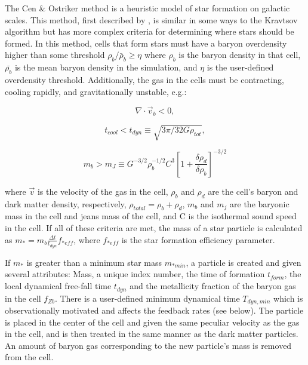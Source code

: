 
The Cen \& Ostriker method is a heuristic model of star formation
on galactic scales.  This method, first described by
\citet{CO1992}, is similar in some ways to the Kravtsov algorithm
but has more complex criteria for determining where stars should
be formed.  In this method, cells that form stars must have a 
baryon overdensity higher than some threshold 
$\rho_b/\bar{\rho}_b \geq \eta$ 
where $\rho_b$ is the baryon density in that cell, 
$\bar{\rho_b}$ is the mean baryon density in the simulation,
and $\eta$ is the user-defined overdensity threshold.
Additionally, the gas in the cells must be contracting, 
cooling rapidly, and gravitationally unstable, e.g.:

\begin{equation}
\nabla \cdot \vec{v}_b < 0,
\label{cencont}
\end{equation}

\begin{equation}
t_{cool} < t_{dyn} \equiv \sqrt{3 \pi / 32G \rho_{tot}},
\end{equation}

\begin{equation}
m_{b} > m_{J} \equiv G^{-3/2} \rho_{b}^{-1/2}C^{3}
\left[ 1 + \frac{\delta\rho_{d}}{\delta\rho_{b}} \right]^{-3/2}
\end{equation}

where $\vec{v}$ is the velocity of the gas in the cell, $\rho_{b}$ and 
$\rho_{d}$ are the cell's baryon and dark matter density, respectively,
$\rho_{total} = \rho_{b} + \rho_{d}$, $m_{b}$ and $m_{j}$ are the 
baryonic mass in the cell and jeans mass of the cell, and C is the 
isothermal sound speed in the cell.  
If all of these criteria are met, 
the mass of a star particle is calculated as \(m_{*} = m_{b} 
\frac{ \Delta t}{ t_{dyn} } f_{*eff} \), 
where $f_{*eff}$ is the star formation efficiency parameter.

If $m_{*}$ is greater than a minimum star mass $m_{*min}$, a particle 
is created and given several attributes:  Mass, a unique index number, 
the time of formation $t_{form}$, the local dynamical free-fall time 
$t_{dyn}$ and the metallicity fraction of the baryon gas in the cell 
$f_{Zb}$.  There is a user-defined minimum dynamical time
$T_{dyn,min}$ which is observationally motivated and affects the
feedback rates (see below).
The particle is placed in the center of the cell and given 
the same peculiar velocity as the gas in the cell, and is then treated 
in the same manner as the dark matter particles.  An 
amount of baryon gas corresponding to the new particle's mass is 
removed from the cell.  


